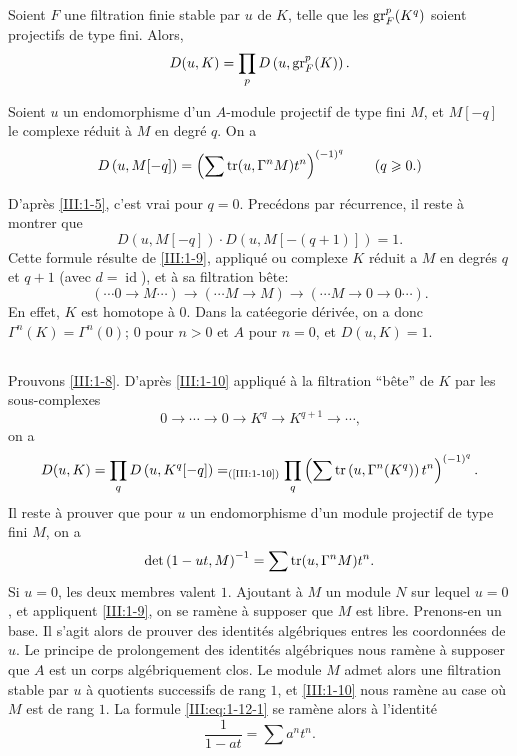 \documentclass[oneside]{book}
\begin{document}
\begin{lemma_}\label{III:1-10}
Soient $F$ une filtration finie stable par $u$ de $K$, telle que les 
$\operatorname{gr}_F^p(K^q)$ soient projectifs de type fini. Alors, 
\[
  D(u,K) = \prod_p D\left(u,\operatorname{gr}_F^p(K)\right) \text{.}
\]
\end{lemma_}





\begin{lemma_}\label{III:1-11}
Soient $u$ un endomorphisme d'un $A$-module projectif de type fini $M$, et 
$M[-q]$ le complexe r\'eduit \`a $M$ en degr\'e $q$. On a 
\[
  D\left(u,M[-q]\right) = \left(\sum \operatorname{tr}(u,\Gamma^n M) t^n\right)^{(-1)^q} \qquad \text{($q\geqslant 0$.)}
\]
\end{lemma_}





D'apr\`es \ref{III:1-5}, c'est vrai pour $q=0$. Prec\'edons par r\'ecurrence, il 
reste \`a montrer que 
\[
  D\left(u,M[-q]\right) \cdot D\left(u,M[-(q+1)]\right) = 1 \text{.}
\]
Cette formule r\'esulte de \ref{III:1-9}, appliqu\'e ou complexe $K$ r\'eduit a 
$M$ en degr\'es $q$ et $q+1$ (avec $d=\operatorname{id}$), et \`a sa 
filtration b\^ete:
\[
  (\cdots 0 \to M \cdots) \to (\cdots M \to M) \to (\cdots M \to 0 \to 0 \cdots) \text{.}
\]
En effet, $K$ est homotope \`a $0$. Dans la cat\'eegorie d\'eriv\'ee, on a donc 
$\Gamma^n(K)=\Gamma^n(0)$; $0$ pour $n>0$ et $A$ pour $n=0$, et $D(u,K)=1$. 





\subsection{}\label{III:1-12}

Prouvons \ref{III:1-8}. D'apr\`es \ref{III:1-10} appliqu\'e \`a la filtration 
``b\^ete'' de $K$ par les sous-complexes 
\[
  0 \to \cdots \to 0 \to K^q \to K^{q+1} \to \cdots \text{,}
\]
on a 
\[
  D(u,K) = \prod_q D\left(u,K^q[-q]\right) =_{\text{(\ref{III:1-10})}} \prod_q \left(\sum \operatorname{tr}\left(u,\Gamma^n(K^q)\right) t^n \right)^{(-1)^q} \text{.}
\]
Il reste \`a prouver que pour $u$ un endomorphisme d'un module projectif de type 
fini $M$, on a 
\begin{equation}\label{III:eq:1-12-1}
  \det\left(1-u t,M\right)^{-1} = \sum \operatorname{tr}(u,\Gamma^n M) t^n \text{.}
\end{equation}
Si $u=0$, les deux membres valent $1$. Ajoutant \`a $M$ un module $N$ sur lequel 
$u=0$, et appliquent \ref{III:1-9}, on se ram\`ene \`a supposer que $M$ est libre. 
Prenons-en un base. Il s'agit alors de prouver des identit\'es alg\'ebriques 
entres les coordonn\'ees de $u$. Le principe de prolongement des identit\'es 
alg\'ebriques nous ram\`ene \`a supposer que $A$ est un corps alg\'ebriquement 
clos. Le module $M$ admet alors une filtration stable par $u$ \`a quotients 
successifs de rang $1$, et \ref{III:1-10} nous ram\`ene au case o\`u $M$ est de 
rang $1$. La formule \eqref{III:eq:1-12-1} se ram\`ene alors \`a l'identit\'e 
\[
  \frac{1}{1-a t} = \sum a^n t^n \text{.}
\]
\end{document}
